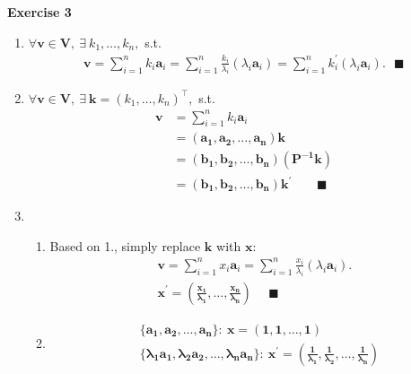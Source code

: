 \documentclass[11pt,letter,notitlepage]{article}
\begin{document}
\begin{solution}
	\textbf{Exercise 3}
	\begin{enumerate}
		\item 
		$\forall \mathbf{v \in V},~\exists~k_1,\dots,k_n,$ s.t.
		\begin{align*}
			\mathbf{v}
			=\sum_{i=1}^n{k_i\mathbf{a}_i}
			=\sum_{i=1}^n{\frac{k_i}{\lambda_i}(\lambda_i\mathbf{a}_i)}
			=\sum_{i=1}^n{k_i^{\prime}(\lambda_i\mathbf{a}_i)}.~~~ \blacksquare
		\end{align*}
	 
		\item
		$\forall \mathbf{v \in V},~\exists~\mathbf{k}=(k_1,\dots,k_n)^{\top},$ s.t.
		\begin{align*}
			\mathbf{v}
			&=\sum_{i=1}^n{k_i\mathbf{a}_i}\\
			&=\mathbf{(a_1,a_2,\dots,a_n)k}\\
			&=\mathbf{(b_1,b_2,\dots,b_n)(P^{-1}k)}\\
			&=\mathbf{(b_1,b_2,\dots,b_n)k^{\prime}}~~~~~~~~~ \blacksquare
		\end{align*}
		
		\item
		\begin{enumerate}
			\item 
			Based on 1., simply replace $\mathbf{k}$ with $\mathbf{x}$:
			\begin{align*}
				\mathbf{v}
				=\sum_{i=1}^n{x_i\mathbf{a}_i}
				=\sum_{i=1}^n{\frac{x_i}{\lambda_i}(\lambda_i\mathbf{a}_i)}.\\
				\mathbf{x^{\prime}=(\frac{x_1}{\lambda_1},\dots,\frac{x_n}{\lambda_n})}~~~~~~\blacksquare
			\end{align*}
			
			\item
			\begin{align*}
				&\mathbf{\{a_1,a_2,\dots,a_n\}: ~x=(1,1,\dots,1)}\\
				&\mathbf{\{\lambda_{1}a_1,\lambda_2a_2,\dots,\lambda_{n}a_n\}:~x^{\prime}=(\frac{1}{\lambda_1},\frac{1}{\lambda_2},\dots,\frac{1}{\lambda_n})}
			\end{align*}

		\end{enumerate}

	\end{enumerate}
	
\end{solution}

\newpage
\end{document}

